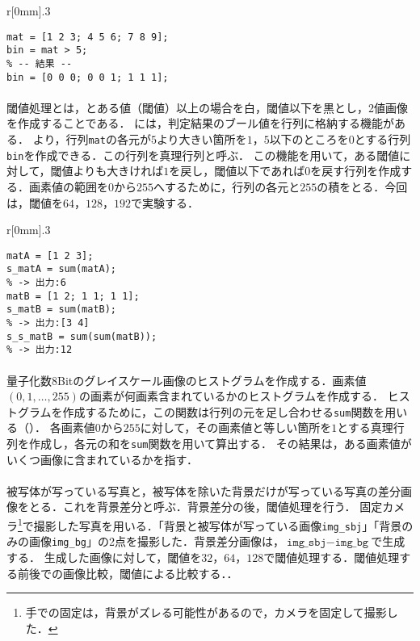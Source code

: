 \begin{wrapfigure}{r}[0mm]{.3\textwidth}
    \centering
    \vspace{-.7cm}
    \begin{lstlisting}[caption={判定結果の格納},label={src:判定結果の格納}]
mat = [1 2 3; 4 5 6; 7 8 9];
bin = mat > 5;
% -- 結果 --
bin = [0 0 0; 0 0 1; 1 1 1];     
    \end{lstlisting}
    \vspace{-.5cm}
\end{wrapfigure}
\paragraph{\kadaiad}
閾値処理とは，とある値（閾値）以上の場合を白，閾値以下を黒とし，2値画像を作成することである．
\matlab には，判定結果のブール値を行列に格納する機能がある．
より，行列\texttt{mat}の各元が\(5\)より大きい箇所を\(1\)，\(5\)以下のところを\(0\)とする行列\texttt{bin}を作成できる．この行列を真理行列と呼ぶ．
この機能を用いて，ある閾値に対して，閾値よりも大きければ\(1\)を戻し，閾値以下であれば\(0\)を戻す行列を作成する．画素値の範囲を\(0\)から\(255\)へするために，行列の各元と\(255\)の積をとる．今回は，閾値を\(64\)，\(128\)，\(192\)で実験する．\scall{\kadaiad}

\begin{wrapfigure}{r}[0mm]{.3\textwidth}
    \centering
    \vspace{-1cm}
    \begin{lstlisting}[caption={\texttt{sum}関数},label={src:sum関数}]
matA = [1 2 3];
s_matA = sum(matA); 
% -> 出力:6
matB = [1 2; 1 1; 1 1];
s_matB = sum(matB); 
% -> 出力:[3 4]
s_s_matB = sum(sum(matB)); 
% -> 出力:12
    \end{lstlisting}
    \vspace{-.7cm}
\end{wrapfigure}
\paragraph{\kadaiae}
量子化数8Bitのグレイスケール画像のヒストグラムを作成する．画素値\((0,1,\dots ,255)\)の画素が何画素含まれているかのヒストグラムを作成する．
ヒストグラムを作成するために，この関数は行列の元を足し合わせる\texttt{sum}関数を用いる（）．
各画素値\(0\)から\(255\)に対して，その画素値と等しい箇所を\(1\)とする真理行列を作成し，各元の和を\texttt{sum}関数を用いて算出する．
その結果は，ある画素値がいくつ画像に含まれているかを指す．
\paragraph{\kadaiaf}
被写体が写っている写真と，被写体を除いた背景だけが写っている写真の差分画像をとる．これを背景差分と呼ぶ．背景差分の後，閾値処理を行う．
固定カメラ\footnote{手での固定は，背景がズレる可能性があるので，カメラを固定して撮影した．}で撮影した写真を用いる．「背景と被写体が写っている画像\texttt{img\_sbj}」「背景のみの画像\texttt{img\_bg}」の2点を撮影した．背景差分画像は，\(\texttt{img\_sbj}-\texttt{img\_bg}\)で生成する．
生成した画像に対して，閾値を\(32\)，\(64\)，\(128\)で閾値処理する．閾値処理する前後での画像比較，閾値による比較する．\scall{\kadaiaf}．

